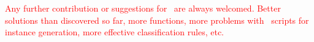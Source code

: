 \textcolor{red}{Any further contribution or suggestions for \siplibtwo\ are always welcomed. Better solutions than discovered so far, more functions, more problems with \julia\ scripts for instance generation, more effective classification rules, etc.}